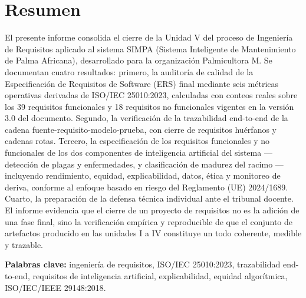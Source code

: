 \documentclass[11pt,a4paper]{article}
\begin{document}
\section*{Resumen}
\noindent
El presente informe consolida el cierre de la Unidad V del proceso de Ingeniería de Requisitos
aplicado al sistema SIMPA (Sistema Inteligente de Mantenimiento de Palma Africana), desarrollado
para la organización Palmicultora M. Se documentan cuatro resultados: primero, la auditoría de
calidad de la Especificación de Requisitos de Software (ERS) final mediante seis métricas
operativas derivadas de ISO/IEC 25010:2023, calculadas con conteos reales sobre los 39 requisitos
funcionales y 18 requisitos no funcionales vigentes en la versión 3.0 del documento. Segundo, la
verificación de la trazabilidad end-to-end de la cadena fuente-requisito-modelo-prueba, con cierre
de requisitos huérfanos y cadenas rotas. Tercero, la especificación de los requisitos funcionales y
no funcionales de los dos componentes de inteligencia artificial del sistema --- detección de
plagas y enfermedades, y clasificación de madurez del racimo --- incluyendo rendimiento, equidad,
explicabilidad, datos, ética y monitoreo de deriva, conforme al enfoque basado en riesgo del
Reglamento (UE) 2024/1689. Cuarto, la preparación de la defensa técnica individual ante el
tribunal docente. El informe evidencia que el cierre de un proyecto de requisitos no es la adición
de una fase final, sino la verificación empírica y reproducible de que el conjunto de artefactos
producido en las unidades I a IV constituye un todo coherente, medible y trazable.

\vspace{0.3cm}
\noindent\textbf{Palabras clave:} ingeniería de requisitos, ISO/IEC 25010:2023, trazabilidad
end-to-end, requisitos de inteligencia artificial, explicabilidad, equidad algorítmica, ISO/IEC/IEEE
29148:2018.

\bigskip
\end{document}
